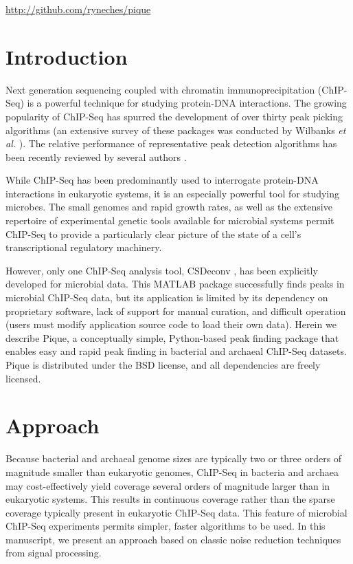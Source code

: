 \begin{refsection}
\url{http://github.com/ryneches/pique}

\section{Introduction}

Next generation sequencing coupled with chromatin
immuno\-pre\-cipi\-tation (ChIP-Seq) is a powerful technique for
studying protein-DNA interactions. The growing popularity of ChIP-Seq
has spurred the development of over thirty peak picking algorithms (an
extensive survey of these packages was conducted by Wilbanks {\em et
  al.} \cite{wilbanks}). The relative performance of representative
peak detection algorithms has been recently reviewed by several
authors \cite{Pepke, Laajala_review, too_many_peak_callers,
  peakranger, peak_benchmark}.

While ChIP-Seq has been predominantly used to interrogate protein-DNA
interactions in eukaryotic systems, it is an especially powerful tool
for studying microbes. The small genomes and rapid growth rates, as
well as the extensive repertoire of experimental genetic tools
available for microbial systems permit ChIP-Seq to provide a
particularly clear picture of the state of a cell's transcriptional
regulatory machinery.

However, only one ChIP-Seq analysis tool, CSDeconv \cite{CSDeconv},
has been explicitly developed for microbial data.  This MATLAB package
successfully finds peaks in microbial ChIP-Seq data, but its
application is limited by its dependency on proprietary software, lack
of support for manual curation, and difficult operation (users must
modify application source code to load their own
data). \cite{wilbanks} Herein we describe Pique, a conceptually
simple, Python-based peak finding package that enables easy and rapid
peak finding in bacterial and archaeal ChIP-Seq datasets. Pique is
distributed under the BSD license, and all dependencies are freely
licensed.

\section{Approach}

\noindent Because bacterial and archaeal genome sizes are typically
two or three orders of magnitude smaller than eukaryotic genomes,
ChIP-Seq in bacteria and archaea may cost-effectively yield coverage
several orders of magnitude larger than in eukaryotic systems. This
results in continuous coverage rather than the sparse coverage
typically present in eukaryotic ChIP-Seq data.  This feature of
microbial ChIP-Seq experiments permits simpler, faster algorithms to
be used. In this manuscript, we present an approach based on classic
noise reduction techniques from signal processing.


\end{refsection}
